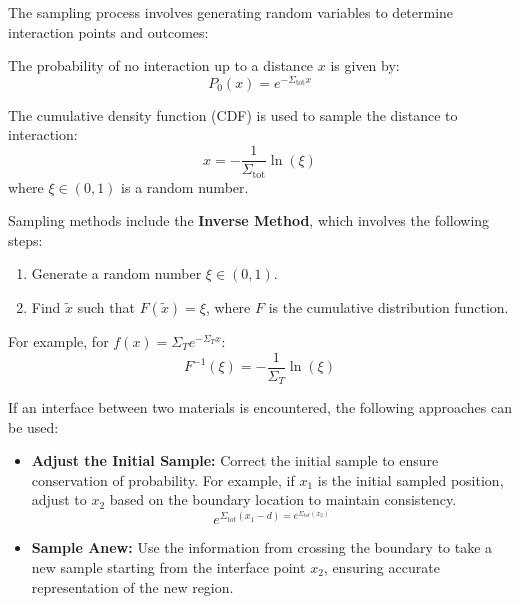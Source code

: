 The sampling process involves generating random variables to determine interaction points and outcomes:

The probability of no interaction up to a distance $x$ is given by:
\begin{equation}
P_0(x) = e^{-\Sigma_{\text{tot}} x}
\end{equation}

The cumulative density function (CDF) is used to sample the distance to interaction:
\begin{equation}
x = -\frac{1}{\Sigma_{\text{tot}}}\ln(\xi)
\end{equation}
where $\xi \in (0, 1)$ is a random number.

Sampling methods include the \textbf{Inverse Method}, which involves the following steps:
\begin{enumerate}
\item Generate a random number $\xi \in (0, 1)$.
\item Find $\tilde{x}$ such that $F(\tilde{x}) = \xi$, where $F$ is the cumulative distribution function.
\end{enumerate}
For example, for $f(x) = \Sigma_T e^{-\Sigma_T x}$:
\begin{equation}
F^{-1}(\xi) = -\frac{1}{\Sigma_T} \ln(\xi)
\end{equation}

If an interface between two materials is encountered, the following approaches can be used:
\begin{itemize}
\item \textbf{Adjust the Initial Sample:} Correct the initial sample to ensure conservation of probability. For example, if $x_1$ is the initial sampled position, adjust to $x_2$ based on the boundary location to maintain consistency.
\begin{equation}
e^{\Sigma_{tot}(x_1 - d) = e^{\Sigma_{tot}(x_2)}}
\end{equation}
\item \textbf{Sample Anew:} Use the information from crossing the boundary to take a new sample starting from the interface point $x_2$, ensuring accurate representation of the new region.
\end{itemize}

